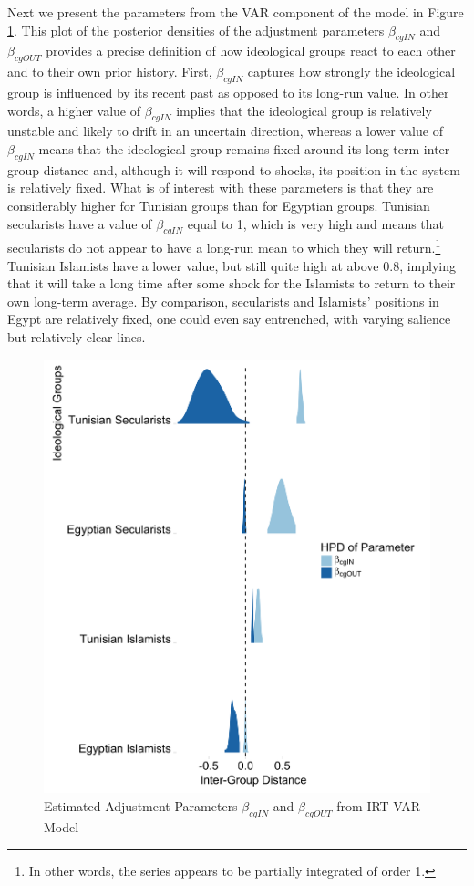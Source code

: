 \documentclass[12pt]{article}
\begin{document}
Next we present the parameters from the VAR component of the model in Figure \ref{varparam}. This plot of the posterior densities of the adjustment parameters $\beta_{cgIN}$ and $\beta_{cgOUT}$ provides a precise definition of how ideological groups react to each other and to their own prior history. First, $\beta_{cgIN}$ captures how strongly the ideological group is influenced by its recent past as opposed to its long-run value. In other words, a higher value of  $\beta_{cgIN}$ implies that the ideological group is relatively unstable and likely to drift in an uncertain direction, whereas a lower value of $\beta_{cgIN}$ means that the ideological group remains fixed around its long-term inter-group distance and, although it will respond to shocks, its position in the system is relatively fixed. What is of interest with these parameters is that they are considerably higher for Tunisian groups than for Egyptian groups. Tunisian secularists have a value of $\beta_{cgIN}$ equal to 1, which is very high and means that secularists do not appear to have a long-run mean to which they will return.\footnote{In other words, the series appears to be partially integrated of order 1.} Tunisian Islamists have a lower value, but still quite high at above 0.8, implying that it will take a long time after some shock for the Islamists to return to their own long-term average. By comparison, secularists and Islamists' positions in Egypt are relatively fixed, one could even say entrenched, with varying salience but relatively clear lines.
 \begin{figure}[!h]
	\centering
	\caption{Estimated Adjustment Parameters $\beta_{cgIN}$ and $\beta_{cgOUT}$ from IRT-VAR Model}\label{varparam}
	\centering
	\includegraphics[width=.9\linewidth]{adj_par}
\end{figure}
\end{document}
